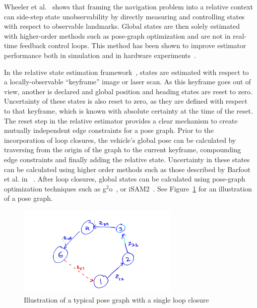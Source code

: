 Wheeler et al.~\cite{Wheeler2017a} shows that framing the navigation problem into a relative context can side-step state unobservability by directly measuring and controlling states with respect to observable landmarks.  Global states are then solely estimated with higher-order methods such as pose-graph optimization and are not in real-time feedback control loops.  This method has been shown to improve estimator performance both in simulation and in hardware experiments~\cite{Wheeler2017a, Wheeler2017b}.

In the relative state estimation framework~\cite{Koch2017}, states are estimated with respect to a locally-observable ``keyframe'' image or laser scan.  As this keyframe goes out of view, another is declared and global position and heading states are reset to zero.  Uncertainty of these states is also reset to zero, as they are defined with respect to that keyframe, which is known with absolute certainty at the time of the reset.  The reset step in the relative estimator provides a clear mechanism to create mutually independent edge constraints for a pose graph.  Prior to the incorporation of loop closures, the vehicle's global pose can be calculated by traversing from the origin of the graph to the current keyframe, compounding edge constraints and finally adding the relative state.  Uncertainty in these states can be calculated using higher order methods such as those described by Barfoot et al. in ~\cite{Barfoot2014}.  After loop closures, global states can be calculated using pose-graph optimization techniques such as g$^2$o~\cite{Kummerle2011}, or iSAM2~\cite{Kaess2012}.  See Figure~\ref{fig:pose_graph} for an illustration of a pose graph.

\begin{figure}
  \includegraphics[width=0.7\textwidth]{figures/pose_graph.jpg}
  \caption{Illustration of a typical pose graph with a single loop closure}
  \label{fig:pose_graph}
\end{figure}

